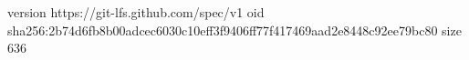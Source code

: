 version https://git-lfs.github.com/spec/v1
oid sha256:2b74d6fb8b00adcec6030c10eff3f9406ff77f417469aad2e8448c92ee79bc80
size 636
